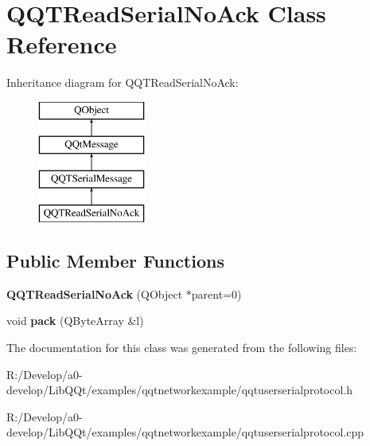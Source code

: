 \hypertarget{class_q_q_t_read_serial_no_ack}{}\section{Q\+Q\+T\+Read\+Serial\+No\+Ack Class Reference}
\label{class_q_q_t_read_serial_no_ack}
Inheritance diagram for Q\+Q\+T\+Read\+Serial\+No\+Ack\+:\begin{figure}[H]
\begin{center}
\leavevmode
\includegraphics[height=4.000000cm]{class_q_q_t_read_serial_no_ack}
\end{center}
\end{figure}
\subsection*{Public Member Functions}
\begin{DoxyCompactItemize}
\item 
\mbox{\label{class_q_q_t_read_serial_no_ack_a994eb9e761c735123f4ed0eecbc7644e}} 
{\bfseries Q\+Q\+T\+Read\+Serial\+No\+Ack} (Q\+Object $\ast$parent=0)
\item 
\mbox{\label{class_q_q_t_read_serial_no_ack_a969537263befd6b4c10a4fa455c81462}} 
void {\bfseries pack} (Q\+Byte\+Array \&l)
\end{DoxyCompactItemize}


The documentation for this class was generated from the following files\+:\begin{DoxyCompactItemize}
\item 
R\+:/\+Develop/a0-\/develop/\+Lib\+Q\+Qt/examples/qqtnetworkexample/qqtuserserialprotocol.\+h\item 
R\+:/\+Develop/a0-\/develop/\+Lib\+Q\+Qt/examples/qqtnetworkexample/qqtuserserialprotocol.\+cpp\end{DoxyCompactItemize}
